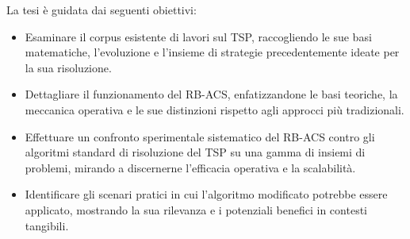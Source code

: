 La tesi è guidata dai seguenti obiettivi:

\begin{itemize}
	\item Esaminare il corpus esistente di lavori sul \Gls{TSP}, raccogliendo le sue basi matematiche, l'evoluzione e l'insieme di strategie precedentemente ideate per la sua risoluzione.
  \item Dettagliare il funzionamento del \Gls{RB-ACS}, enfatizzandone le basi teoriche, la meccanica operativa e le sue distinzioni rispetto agli approcci più tradizionali.
  \item Effettuare un confronto sperimentale sistematico del \Gls{RB-ACS} contro gli algoritmi standard di risoluzione del \Gls{TSP} su una gamma di insiemi di problemi, mirando a discernerne l'efficacia operativa e la scalabilità.
	\item Identificare gli scenari pratici in cui l'algoritmo modificato potrebbe essere applicato, mostrando la sua rilevanza e i potenziali benefici in contesti tangibili.
\end{itemize}





